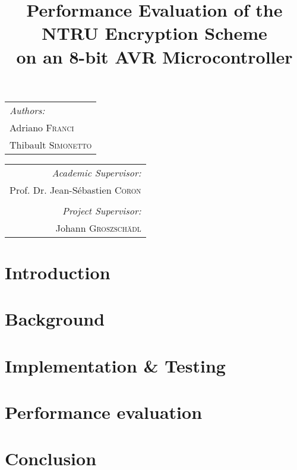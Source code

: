 \documentclass[11pt,a4paper]{article}
\begin{document}
\title{Performance Evaluation of the NTRU Encryption Scheme\\ on an 8-bit AVR 
Microcontroller}
\maketitle

\begin{tabular}[t]{@{}l} 
	\textit{Authors:}\\
	Adriano \textsc{Franci}\\
	Thibault \textsc{Simonetto}\\
\end{tabular}
\hfill
\begin{tabular}[t]{r@{}}
	\textit{Academic Supervisor:}\\
	Prof. Dr. Jean-S\'ebastien \textsc{Coron}\\
	\vspace{1em}\\
	\textit{Project Supervisor:}\\
	Johann \textsc{Groszsch\"adl}\\
\end{tabular}

\section{Introduction}
\section{Background}
\section{Implementation \& Testing}
\section{Performance evaluation}
\section{Conclusion}
\end{document}
